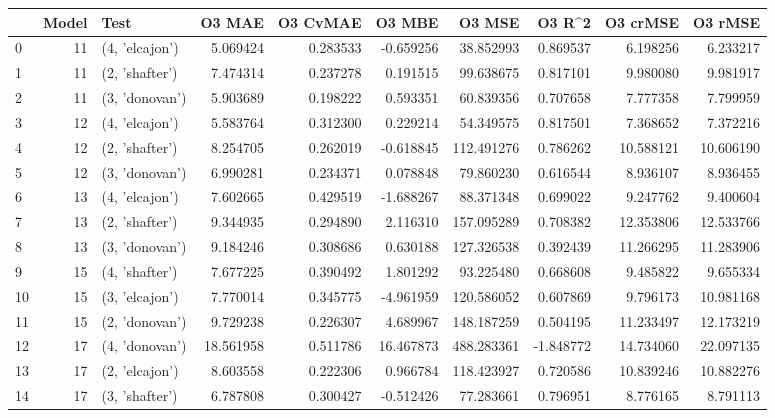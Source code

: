 \begin{tabular}{lrlrrrrrrr}
\toprule
{} &  Model &            Test &     O3 MAE &  O3 CvMAE &     O3 MBE &      O3 MSE &    O3 R\textasciicircum2 &   O3 crMSE &    O3 rMSE \\
\midrule
0  &     11 &  (4, 'elcajon') &   5.069424 &  0.283533 &  -0.659256 &   38.852993 &  0.869537 &   6.198256 &   6.233217 \\
1  &     11 &  (2, 'shafter') &   7.474314 &  0.237278 &   0.191515 &   99.638675 &  0.817101 &   9.980080 &   9.981917 \\
2  &     11 &  (3, 'donovan') &   5.903689 &  0.198222 &   0.593351 &   60.839356 &  0.707658 &   7.777358 &   7.799959 \\
3  &     12 &  (4, 'elcajon') &   5.583764 &  0.312300 &   0.229214 &   54.349575 &  0.817501 &   7.368652 &   7.372216 \\
4  &     12 &  (2, 'shafter') &   8.254705 &  0.262019 &  -0.618845 &  112.491276 &  0.786262 &  10.588121 &  10.606190 \\
5  &     12 &  (3, 'donovan') &   6.990281 &  0.234371 &   0.078848 &   79.860230 &  0.616544 &   8.936107 &   8.936455 \\
6  &     13 &  (4, 'elcajon') &   7.602665 &  0.429519 &  -1.688267 &   88.371348 &  0.699022 &   9.247762 &   9.400604 \\
7  &     13 &  (2, 'shafter') &   9.344935 &  0.294890 &   2.116310 &  157.095289 &  0.708382 &  12.353806 &  12.533766 \\
8  &     13 &  (3, 'donovan') &   9.184246 &  0.308686 &   0.630188 &  127.326538 &  0.392439 &  11.266295 &  11.283906 \\
9  &     15 &  (4, 'shafter') &   7.677225 &  0.390492 &   1.801292 &   93.225480 &  0.668608 &   9.485822 &   9.655334 \\
10 &     15 &  (3, 'elcajon') &   7.770014 &  0.345775 &  -4.961959 &  120.586052 &  0.607869 &   9.796173 &  10.981168 \\
11 &     15 &  (2, 'donovan') &   9.729238 &  0.226307 &   4.689967 &  148.187259 &  0.504195 &  11.233497 &  12.173219 \\
12 &     17 &  (4, 'donovan') &  18.561958 &  0.511786 &  16.467873 &  488.283361 & -1.848772 &  14.734060 &  22.097135 \\
13 &     17 &  (2, 'elcajon') &   8.603558 &  0.222306 &   0.966784 &  118.423927 &  0.720586 &  10.839246 &  10.882276 \\
14 &     17 &  (3, 'shafter') &   6.787808 &  0.300427 &  -0.512426 &   77.283661 &  0.796951 &   8.776165 &   8.791113 \\

\end{tabular}
